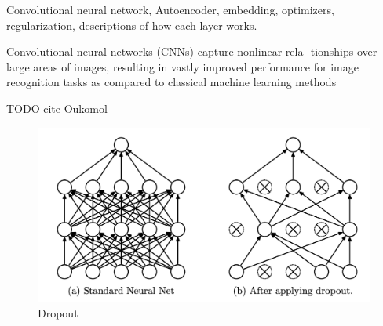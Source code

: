 Convolutional neural network, Autoencoder, embedding, optimizers, regularization, descriptions of how each layer works.

Convolutional neural networks (CNNs) capture nonlinear rela- tionships over large areas of images, resulting in vastly improved performance for image recognition tasks as compared to classical machine learning methods

TODO cite Oukomol

\begin{figure}[htb]
	\begin{center}
		\includegraphics[width=0.8\linewidth]{bilder/dropout.png}
		\caption{Dropout}\label{fig:dropout}
	\end{center}
\end{figure}